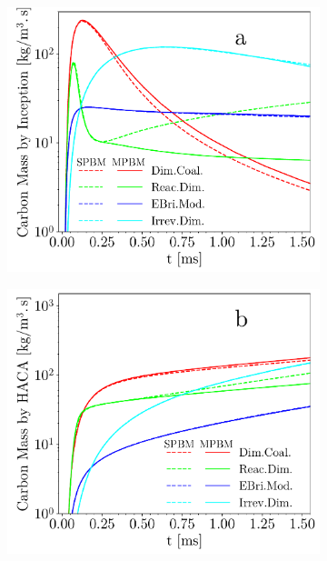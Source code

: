 \begin{figure}[H]
	\centering
	\begin{subfigure}[t]{0.32\textwidth}
		\includegraphics[width=1\textwidth]{Figures/Results/Shocktube/Stanford/June/stsh_single_inc.pdf}
	\end{subfigure}
	\begin{subfigure}[t]{0.32\textwidth}
		\includegraphics[width=1\textwidth]{Figures/Results/Shocktube/Stanford/June/stsh_single_HACA.pdf}
	\end{subfigure}

\end{figure}
